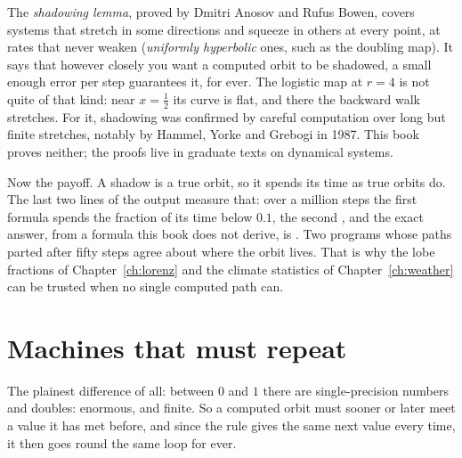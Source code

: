 \begin{rigourbox}
The \emph{shadowing lemma}, proved by Dmitri Anosov and Rufus Bowen, covers
systems that stretch in some directions and squeeze in others at every point,
at rates that never weaken (\emph{uniformly hyperbolic} ones, such as the
doubling map). It says that however closely you want a computed orbit to be
shadowed, a small enough error per step guarantees it, for ever. The logistic
map at $r = 4$ is not quite of that kind: near $x = \tfrac{1}{2}$ its curve is
flat, and there the backward walk stretches. For it, shadowing was confirmed
by careful computation over long but finite stretches, notably by Hammel,
Yorke and Grebogi in 1987. This book proves neither; the proofs live in
graduate texts on dynamical systems.
\end{rigourbox}

\noindent
Now the payoff. A shadow is a true orbit, so it spends its time as true
orbits do. The last two lines of the output measure that: over a million
steps the first formula spends the fraction  of its time
below $\num{0.1}$, the second , and the exact answer, from
a formula this book does not derive, is . Two programs whose paths parted after fifty steps
agree about where the orbit lives. That is why the lobe fractions of
Chapter~\ref{ch:lorenz} and the climate statistics of
Chapter~\ref{ch:weather} can be trusted when no single computed path can.



\section{Machines that must repeat}
\label{sec:ch16-random}

\noindent
The plainest difference of all: between $0$ and $1$ there are  single-precision
numbers and  doubles: enormous, and finite. So a
computed orbit must sooner or later meet a value it has met before, and since
the rule gives the same next value every time, it then goes round the same
loop for ever.

